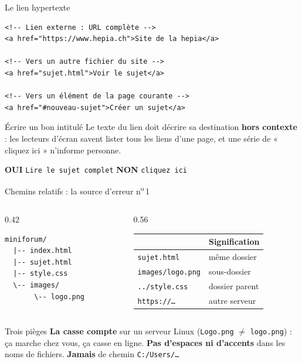 \documentclass[aspectratio=169,11pt]{beamer}
\newcommand{\hdr}[1]{\multicolumn{1}{l}{\color{white}\bfseries #1}}
\begin{document}
\begin{frame}[fragile]{Le lien hypertexte}
\begin{lstlisting}[language=HTML5]
<!-- Lien externe : URL complète -->
<a href="https://www.hepia.ch">Site de la hepia</a>

<!-- Vers un autre fichier du site -->
<a href="sujet.html">Voir le sujet</a>

<!-- Vers un élément de la page courante -->
<a href="#nouveau-sujet">Créer un sujet</a>
\end{lstlisting}
  \vspace{0.2cm}
  \begin{alertblock}{Écrire un bon intitulé}
    Le texte du lien doit décrire sa destination \textbf{hors contexte} : les lecteurs d'écran savent lister tous les liens d'une page, et une série de « cliquez ici » n'informe personne.
    \vspace{0.15cm}

    \textcolor{successGreen}{\textbf{OUI}} \texttt{Lire le sujet complet} \qquad
    \textcolor{alertRed}{\textbf{NON}} \texttt{cliquez ici}
  \end{alertblock}
\end{frame}

\begin{frame}[fragile]{Chemins relatifs : la source d'erreur n\textsuperscript{o}\,1}
  \begin{columns}[T]
    \begin{column}{0.42\textwidth}
\begin{lstlisting}
miniforum/
  |-- index.html
  |-- sujet.html
  |-- style.css
  \-- images/
       \-- logo.png
\end{lstlisting}
    \end{column}
    \begin{column}{0.56\textwidth}
      \small
      \begin{tabularx}{\linewidth}{p{2.5cm}X}
        \toprule
        \rowcolor{accentBlue}
        \hdr{Écriture} & \hdr{Signification} \\
        \midrule
        \rowcolor{cfptGrey}
        \texttt{sujet.html} & même dossier \\
        \texttt{images/logo.png} & sous-dossier \\
        \rowcolor{cfptGrey}
        \texttt{../style.css} & dossier parent \\
        \texttt{https://\dots} & autre serveur \\
        \bottomrule
      \end{tabularx}
    \end{column}
  \end{columns}
  \vspace{0.3cm}
  \begin{alertblock}{Trois pièges}
    \textbf{La casse compte} sur un serveur Linux (\texttt{Logo.png} $\neq$ \texttt{logo.png}) : ça marche chez vous, ça casse en ligne. \quad
    \textbf{Pas d'espaces ni d'accents} dans les noms de fichiers. \quad
    \textbf{Jamais} de chemin \texttt{C:/Users/\dots}
  \end{alertblock}
\end{frame}
\end{document}
